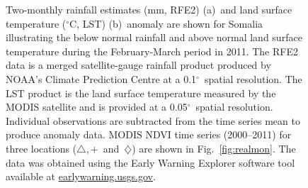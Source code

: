 \documentclass[authoryear,preprint,review,10pt]{elsarticle}
\newcommand{\degree}{\ensuremath{^\circ}}
\begin{document}
\begin{figure} [htp]
\centering
{} %
 \caption{Two-monthly rainfall estimates (mm, RFE2) (a)~and land surface temperature (\degree C, LST) (b)~anomaly are shown for Somalia illustrating the below normal rainfall and above normal land surface temperature during the February-March period in 2011. The RFE2 data is a merged satellite-gauge rainfall product produced by NOAA's Climate Prediction Centre at a 0.1\degree~spatial resolution. The LST product is the land surface temperature measured by the MODIS
 satellite and is provided at a 0.05\degree~spatial resolution. Individual observations are subtracted from the time series mean to produce anomaly data. MODIS
 NDVI time series (2000--2011) for three locations ($\triangle,+$~and~$\diamondsuit$) are shown in Fig.~\ref{fig:realmon}. The data was obtained using the Early Warning Explorer software tool available at \url{earlywarning.usgs.gov}. }
 \label{fig:RF_LSTSomalia}
\end{figure}
\end{document}
